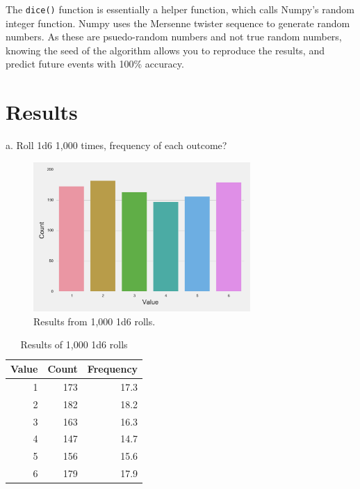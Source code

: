 \documentclass[twocolumn,letterpaper]{article}  %
\begin{document}
The \texttt{dice()} function is essentially a helper function, which calls Numpy's random integer function. Numpy uses the Mersenne twister sequence to generate random numbers. As these are psuedo-random numbers and not true random numbers, knowing the seed of the algorithm allows you to reproduce the results, and predict future events with 100\% accuracy.

\section{Results}

a. Roll 1d6 1,000 times, frequency of each outcome?
\begin{figure}%
\centering
\includegraphics[width=3.25in]{1d6.pdf}
\caption{Results from 1,000 1d6 rolls.}
\end{figure}

\begin{table}%
\begin{center}
\begin{tabular}{*{3}{r}}
\toprule
Value & Count & Frequency \\
\midrule
 1   & 173      & 17.3 \\
 2   & 182      & 18.2 \\
 3   & 163      & 16.3 \\
 4   & 147      & 14.7 \\
 5   & 156      & 15.6 \\
 6   & 179      & 17.9 \\
\bottomrule
\end{tabular}
\end{center}
\caption{Results of 1,000 1d6 rolls}
\end{table}
\end{document}
